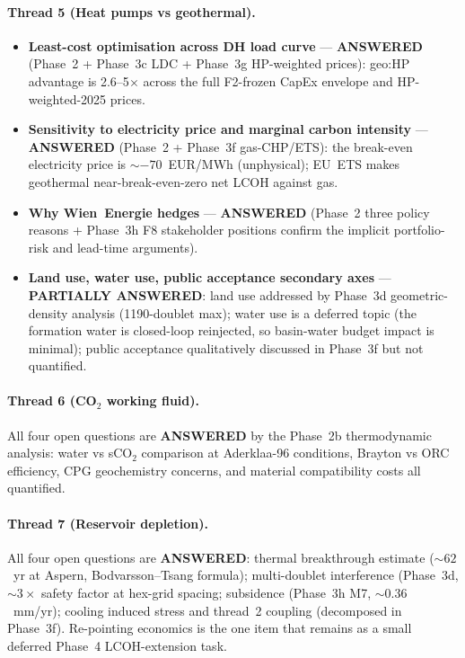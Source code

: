 \documentclass{article}
\begin{document}
\paragraph{Thread 5 (Heat pumps vs geothermal).}
\begin{itemize}
\item \textbf{Least-cost optimisation across DH load curve} ---
\textbf{ANSWERED} (Phase~2 + Phase~3c LDC + Phase~3g HP-weighted prices):
geo:HP advantage is 2.6--5$\times$ across the full F2-frozen CapEx
envelope and HP-weighted-2025 prices.
\item \textbf{Sensitivity to electricity price and marginal carbon
intensity} --- \textbf{ANSWERED} (Phase~2 + Phase~3f gas-CHP/ETS):
the break-even electricity price is $\sim -70$~EUR/MWh (unphysical);
EU~ETS makes geothermal near-break-even-zero net LCOH against gas.
\item \textbf{Why Wien~Energie hedges} --- \textbf{ANSWERED} (Phase~2
three policy reasons + Phase~3h F8 stakeholder positions confirm
the implicit portfolio-risk and lead-time arguments).
\item \textbf{Land use, water use, public acceptance secondary
axes} --- \textbf{PARTIALLY ANSWERED}: land use addressed by Phase~3d
geometric-density analysis (1190-doublet max); water use is a deferred
topic (the formation water is closed-loop reinjected, so basin-water
budget impact is minimal); public acceptance qualitatively discussed
in Phase~3f but not quantified.
\end{itemize}

\paragraph{Thread 6 (CO$_2$ working fluid).}
All four open questions are \textbf{ANSWERED} by the Phase~2b
thermodynamic analysis: water vs sCO$_2$ comparison at Aderklaa-96
conditions, Brayton vs ORC efficiency, CPG geochemistry concerns,
and material compatibility costs all quantified.

\paragraph{Thread 7 (Reservoir depletion).}
All four open questions are \textbf{ANSWERED}: thermal breakthrough
estimate ($\sim 62$~yr at Aspern, Bodvarsson--Tsang formula);
multi-doublet interference (Phase~3d, $\sim 3\times$ safety factor at
hex-grid spacing; subsidence (Phase~3h M7, $\sim 0.36$~mm/yr); cooling
induced stress and thread~2 coupling (decomposed in Phase~3f). Re-pointing
economics is the one item that remains as a small deferred Phase~4
LCOH-extension task.
\end{document}
